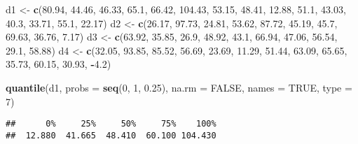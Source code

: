 \documentclass[
]{article}
\newenvironment{Shaded}{\begin{snugshade}}{\end{snugshade}}
\newcommand{\AttributeTok}[1]{\textcolor[rgb]{0.13,0.29,0.53}{#1}}
\newcommand{\ConstantTok}[1]{\textcolor[rgb]{0.56,0.35,0.01}{#1}}
\newcommand{\DecValTok}[1]{\textcolor[rgb]{0.00,0.00,0.81}{#1}}
\newcommand{\FloatTok}[1]{\textcolor[rgb]{0.00,0.00,0.81}{#1}}
\newcommand{\FunctionTok}[1]{\textcolor[rgb]{0.13,0.29,0.53}{\textbf{#1}}}
\newcommand{\NormalTok}[1]{#1}
\newcommand{\OtherTok}[1]{\textcolor[rgb]{0.56,0.35,0.01}{#1}}
\newcommand{\SpecialCharTok}[1]{\textcolor[rgb]{0.81,0.36,0.00}{\textbf{#1}}}
\begin{document}
\begin{Shaded}
\begin{Highlighting}[]
\NormalTok{d1 }\OtherTok{\textless{}{-}} \FunctionTok{c}\NormalTok{(}\FloatTok{80.94}\NormalTok{, }\FloatTok{44.46}\NormalTok{, }\FloatTok{46.33}\NormalTok{, }\FloatTok{65.1}\NormalTok{, }\FloatTok{66.42}\NormalTok{, }\FloatTok{104.43}\NormalTok{, }\FloatTok{53.15}\NormalTok{, }\FloatTok{48.41}\NormalTok{, }\FloatTok{12.88}\NormalTok{, }\FloatTok{51.1}\NormalTok{, }\FloatTok{43.03}\NormalTok{, }\FloatTok{40.3}\NormalTok{, }\FloatTok{33.71}\NormalTok{, }\FloatTok{55.1}\NormalTok{, }\FloatTok{22.17}\NormalTok{)}
\NormalTok{d2 }\OtherTok{\textless{}{-}} \FunctionTok{c}\NormalTok{(}\FloatTok{26.17}\NormalTok{, }\FloatTok{97.73}\NormalTok{, }\FloatTok{24.81}\NormalTok{, }\FloatTok{53.62}\NormalTok{, }\FloatTok{87.72}\NormalTok{, }\FloatTok{45.19}\NormalTok{, }\FloatTok{45.7}\NormalTok{, }\FloatTok{69.63}\NormalTok{, }\FloatTok{36.76}\NormalTok{, }\FloatTok{7.17}\NormalTok{)}
\NormalTok{d3 }\OtherTok{\textless{}{-}} \FunctionTok{c}\NormalTok{(}\FloatTok{63.92}\NormalTok{, }\FloatTok{35.85}\NormalTok{, }\FloatTok{26.9}\NormalTok{, }\FloatTok{48.92}\NormalTok{, }\FloatTok{43.1}\NormalTok{, }\FloatTok{66.94}\NormalTok{, }\FloatTok{47.06}\NormalTok{, }\FloatTok{56.54}\NormalTok{, }\FloatTok{29.1}\NormalTok{, }\FloatTok{58.88}\NormalTok{)}
\NormalTok{d4 }\OtherTok{\textless{}{-}} \FunctionTok{c}\NormalTok{(}\FloatTok{32.05}\NormalTok{, }\FloatTok{93.85}\NormalTok{, }\FloatTok{85.52}\NormalTok{, }\FloatTok{56.69}\NormalTok{, }\FloatTok{23.69}\NormalTok{, }\FloatTok{11.29}\NormalTok{, }\FloatTok{51.44}\NormalTok{, }\FloatTok{63.09}\NormalTok{, }\FloatTok{65.65}\NormalTok{, }\FloatTok{35.73}\NormalTok{, }\FloatTok{60.15}\NormalTok{, }\FloatTok{30.93}\NormalTok{, }\SpecialCharTok{{-}}\FloatTok{4.2}\NormalTok{)}

\FunctionTok{quantile}\NormalTok{(d1, }\AttributeTok{probs =} \FunctionTok{seq}\NormalTok{(}\DecValTok{0}\NormalTok{, }\DecValTok{1}\NormalTok{, }\FloatTok{0.25}\NormalTok{), }\AttributeTok{na.rm =} \ConstantTok{FALSE}\NormalTok{, }\AttributeTok{names =} \ConstantTok{TRUE}\NormalTok{, }\AttributeTok{type =} \DecValTok{7}\NormalTok{)}
\end{Highlighting}
\end{Shaded}

\begin{verbatim}
##      0%     25%     50%     75%    100% 
##  12.880  41.665  48.410  60.100 104.430
\end{verbatim}
\end{document}
